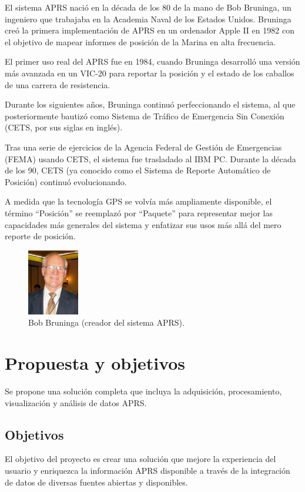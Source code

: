 El sistema APRS nació en la década de los 80 de la mano de Bob Bruninga, un ingeniero que trabajaba en la Academia Naval de los Estados Unidos. Bruninga creó la primera implementación de APRS en un ordenador Apple II en 1982 con el objetivo de mapear informes de posición de la Marina en alta frecuencia. \cite{APRSOrigins}

El primer uso real del APRS fue en 1984, cuando Bruninga desarrolló una versión más avanzada en un VIC-20 para reportar la posición y el estado de los caballos de una carrera de resistencia.

Durante los siguientes años, Bruninga continuó perfeccionando el sistema, al que posteriormente bautizó como Sistema de Tráfico de Emergencia Sin Conexión (CETS, por sus siglas en inglés).

Tras una serie de ejercicios de la Agencia Federal de Gestión de Emergencias (FEMA) usando CETS, el sistema fue trasladado al IBM PC. Durante la década de los 90, CETS (ya conocido como el Sistema de Reporte Automático de Posición) continuó evolucionando.

A medida que la tecnología GPS se volvía más ampliamente disponible, el término ``Posición'' se reemplazó por ``Paquete'' para representar mejor las capacidades más generales del sistema y enfatizar sus usos más allá del mero reporte de posición.

\begin{figure}[h]
	\centering
	\includegraphics[width=0.2\textwidth]{Imagenes/Chapter_1/bob_bruninga.png}
	\caption{Bob Bruninga (creador del sistema APRS).}
	\label{fig:bob-bruninga-es}
\end{figure}


\section{Propuesta y objetivos}
Se propone una solución completa que incluya la adquisición, procesamiento, visualización y análisis de datos APRS. 

\subsection{Objetivos}
El objetivo del proyecto es crear una solución que mejore la experiencia del usuario y enriquezca la información APRS disponible a través de la integración de datos de diversas fuentes abiertas y disponibles.

